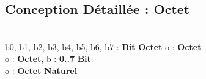 \subsection{Conception Détaillée : Octet}

\begin{algorithme}
    \\
    {b0, b1, b2, b3, b4, b5, b6, b7 : \textbf{Bit}}
    {\textbf{Octet}}
    {}
    {o : \textbf{Octet}}
    {  		
    }
    \\
    {o : \textbf{Octet}, b : \textbf{0..7}}
    {\textbf{Bit}}
    {}
    {}
    {
    }
 	\\
    {o : \textbf{Octet}}
    {\textbf{Naturel}}
    {}
    {}
	{   
    {
    }
    }  
\end{algorithme}
